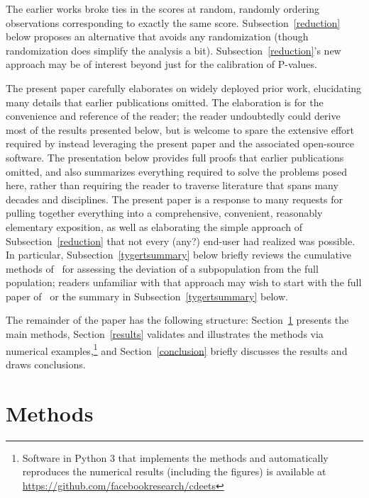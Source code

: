 \documentclass[12pt]{article}
\begin{document}
The earlier works broke ties in the scores at random,
randomly ordering observations corresponding to exactly the same score.
Subsection~\ref{reduction} below proposes an alternative that avoids
any randomization (though randomization does simplify the analysis a bit).
Subsection~\ref{reduction}'s new approach may be of interest beyond just
for the calibration of P-values.

The present paper carefully elaborates on widely deployed prior work,
elucidating many details that earlier publications omitted.
The elaboration is for the convenience and reference of the reader;
the reader undoubtedly could derive most of the results presented below,
but is welcome to spare the extensive effort required by instead leveraging
the present paper and the associated open-source software.
The presentation below provides full proofs that earlier publications omitted,
and also summarizes everything required to solve the problems posed here,
rather than requiring the reader to traverse literature
that spans many decades and disciplines.
The present paper is a response to many requests for pulling together
everything into a comprehensive, convenient, reasonably elementary exposition,
as well as elaborating the simple approach of Subsection~\ref{reduction}
that not every (any?) end-user had realized was possible.
In particular, Subsection~\ref{tygertsummary} below briefly reviews
the cumulative methods of~\citet{tygert_full}
for assessing the deviation of a subpopulation from the full population;
readers unfamiliar with that approach may wish to start
with the full paper of~\citet{tygert_full} or the summary
in Subsection~\ref{tygertsummary} below.

The remainder of the paper has the following structure:
Section~\ref{methods} presents the main methods,
Section~\ref{results} validates and illustrates the methods
via numerical examples,\footnote{Software in Python 3 that implements
the methods and automatically reproduces the numerical results
(including the figures) is available
at \url{https://github.com/facebookresearch/cdeets}}
and Section~\ref{conclusion} briefly discusses
the results and draws conclusions.



\section{Methods}
\label{methods}
\end{document}
